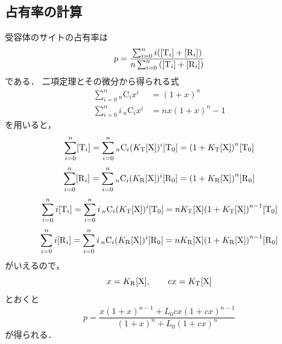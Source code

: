 \subsection{占有率の計算}
受容体のサイトの占有率は
\begin{equation}
  p = \frac{\sum_{i=0}^{n} i\qty([\ce{T_$i$}] + [\ce{R_$i$}])}{n\sum_{i=0}^{n} \qty([\ce{T_$i$}] + [\ce{R_$i$}])}
\end{equation}
である．
二項定理とその微分から得られる式
\begin{align}
  \sum_{i=0}^{n} {}_n \mathrm{C}_i x^i &= (1+x)^n \\
  \sum_{i=0}^{n} i\,{}_n \mathrm{C}_i x^i &= nx(1+x)^n-1
\end{align}
を用いると，
\begin{equation}
  \sum_{i=0}^{n} [\ce{T_$i$}] = \sum_{i=0}^{n} {}_n \mathrm{C}_i (K_{\ce{T}}[\ce{X}])^i [\ce{T0}] = \qty(1+K_{\ce{T}}[\ce{X}])^n [\ce{T0}] 
\end{equation}
\begin{equation}
  \sum_{i=0}^{n} [\ce{R_$i$}] = \sum_{i=0}^{n} {}_n \mathrm{C}_i (K_{\ce{R}}[\ce{X}])^i [\ce{R0}] = \qty(1+K_{\ce{R}}[\ce{X}])^n [\ce{R0}]
\end{equation}
\begin{equation}
  \sum_{i=0}^{n} i[\ce{T_$i$}] = \sum_{i=0}^{n} i\,{}_n \mathrm{C}_i (K_{\ce{T}}[\ce{X}])^i [\ce{T0}] = n K_{\ce{T}}[\ce{X}]\qty(1+K_{\ce{T}}[\ce{X}])^{n-1} [\ce{T0}] 
\end{equation}
\begin{equation}
  \sum_{i=0}^{n} i[\ce{R_$i$}] = \sum_{i=0}^{n} i\,{}_n \mathrm{C}_i (K_{\ce{R}}[\ce{X}])^i [\ce{R0}] = n K_{\ce{R}}[\ce{X}]\qty(1+K_{\ce{R}}[\ce{X}])^{n-1} [\ce{R0}] 
\end{equation}
がいえるので，
\begin{equation}
  x = K_{\ce{R}}[\ce{X}], \qquad cx = K_{\ce{T}}[\ce{X}]
\end{equation}
とおくと
\begin{equation}
  p = \frac{x(1+x)^{n-1} + L_0 cx (1+cx)^{n-1}}{(1+x)^n + L_0 (1+cx)^n} \label{mwc}
\end{equation}
が得られる．

